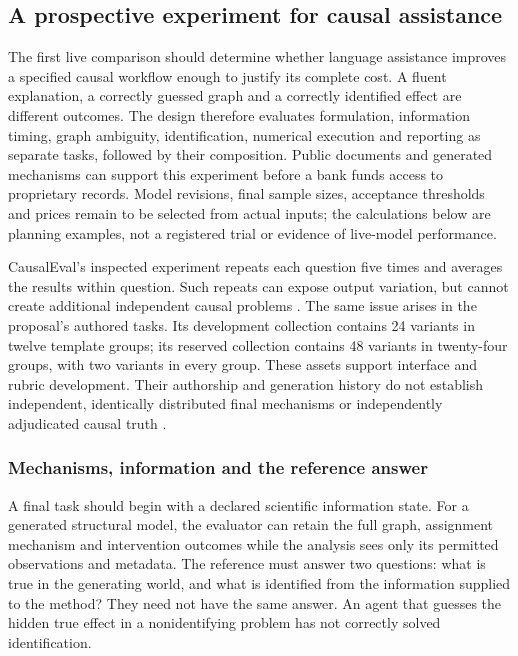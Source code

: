 \hypertarget{a-prospective-experiment-for-causal-assistance}{%
\subsection{A prospective experiment for causal
assistance}\label{a-prospective-experiment-for-causal-assistance}}

\label{exec13:live-design}

The first live comparison should determine whether language assistance
improves a specified causal workflow enough to justify its complete
cost. A fluent explanation, a correctly guessed graph and a correctly
identified effect are different outcomes. The design therefore evaluates
formulation, information timing, graph ambiguity, identification,
numerical execution and reporting as separate tasks, followed by their
composition. Public documents and generated mechanisms can support this
experiment before a bank funds access to proprietary records. Model
revisions, final sample sizes, acceptance thresholds and prices remain
to be selected from actual inputs; the calculations below are planning
examples, not a registered trial or evidence of live-model performance.

CausalEval's inspected experiment repeats each question five times and
averages the results within question. Such repeats can expose output
variation, but cannot create additional independent causal problems
\citep{exec13_census_causaleval}. The same issue arises in the
proposal's authored tasks. Its development collection contains 24
variants in twelve template groups; its reserved collection contains 48
variants in twenty-four groups, with two variants in every group. These
assets support interface and rubric development. Their authorship and
generation history do not establish independent, identically distributed
final mechanisms or independently adjudicated causal truth
\citep{exec13_live_planning}.

\hypertarget{mechanisms-information-and-the-reference-answer}{%
\subsubsection{Mechanisms, information and the reference
answer}\label{mechanisms-information-and-the-reference-answer}}

A final task should begin with a declared scientific information state.
For a generated structural model, the evaluator can retain the full
graph, assignment mechanism and intervention outcomes while the analysis
sees only its permitted observations and metadata. The reference must
answer two questions: what is true in the generating world, and what is
identified from the information supplied to the method? They need not
have the same answer. An agent that guesses the hidden true effect in a
nonidentifying problem has not correctly solved identification.

